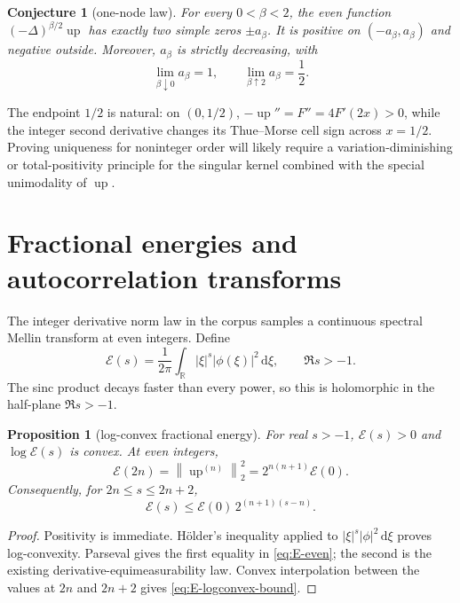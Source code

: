 \documentclass[11pt,oneside]{article}
\numberwithin{equation}{section}
\theoremstyle{plain}
\newtheorem{proposition}[theorem]{Proposition}
\newtheorem{conjecture}[theorem]{Conjecture}
\theoremstyle{definition}
\theoremstyle{remark}
\newcommand{\R}{\mathbb R}
\newcommand{\Up}{\operatorname{up}}
\newcommand{\dd}{\,\mathrm d}
\newcommand{\norm}[1]{\left\lVert#1\right\rVert}
\begin{document}
\begin{conjecture}[one-node law]
\label{conj:one-node}
For every $0<\beta<2$, the even function
$(-\Delta)^{\beta/2}\Up$ has exactly two simple zeros $\pm a_\beta$.
It is positive on $(-a_\beta,a_\beta)$ and negative outside.  Moreover,
$a_\beta$ is strictly decreasing, with
\begin{equation}
 \lim_{\beta\downarrow0}a_\beta=1,
 \qquad
 \lim_{\beta\uparrow2}a_\beta=\frac12.
 \label{eq:one-node-limits}
\end{equation}
\end{conjecture}

The endpoint $1/2$ is natural: on $(0,1/2)$,
$-\Up''=F''=4F'(2x)>0$, while the integer second derivative changes its
Thue--Morse cell sign across $x=1/2$.  Proving uniqueness for noninteger order
will likely require a variation-diminishing or total-positivity principle for
the singular kernel combined with the special unimodality of $\Up$.

\section{Fractional energies and autocorrelation transforms}
\label{sec:fractional-energy}

The integer derivative norm law in the corpus samples a continuous spectral
Mellin transform at even integers.  Define
\begin{equation}
 \mathcal E(s)
 =\frac1{2\pi}\int_{\R}|\xi|^s|\phi(\xi)|^2\dd\xi,
 \qquad \Re s>-1.
 \label{eq:E-s}
\end{equation}
The sinc product decays faster than every power, so this is holomorphic in the
half-plane $\Re s>-1$.

\begin{proposition}[log-convex fractional energy]
For real $s>-1$, $\mathcal E(s)>0$ and $\log\mathcal E(s)$ is convex.  At even
integers,
\begin{equation}
 \mathcal E(2n)=\norm{\Up^{(n)}}_2^2
 =2^{n(n+1)}\mathcal E(0).
 \label{eq:E-even}
\end{equation}
Consequently, for $2n\le s\le2n+2$,
\begin{equation}
 \mathcal E(s)
 \le \mathcal E(0)\,2^{(n+1)(s-n)}.
 \label{eq:E-logconvex-bound}
\end{equation}
\end{proposition}

\begin{proof}
Positivity is immediate.  Hölder's inequality applied to
$|\xi|^s|\phi|^2\dd\xi$ proves log-convexity.  Parseval gives the first equality
in \cref{eq:E-even}; the second is the existing derivative-equimeasurability
law.  Convex interpolation between the values at $2n$ and $2n+2$ gives
\cref{eq:E-logconvex-bound}.
\end{proof}
\end{document}

